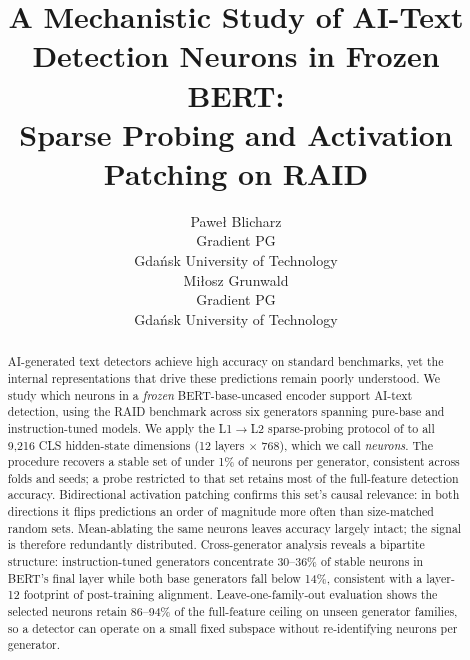 \documentclass[11pt]{article}
\title{A Mechanistic Study of AI-Text Detection Neurons in Frozen BERT:\\
Sparse Probing and Activation Patching on RAID}
\author{
  Paweł Blicharz \\
  Gradient PG \\
  Gdańsk University of Technology \\
  \And
  Miłosz Grunwald \\
  Gradient PG \\
  Gdańsk University of Technology \\
}
\newcommand{\bertbase}{BERT-base-uncased\xspace}
\begin{document}
\maketitle

\begin{abstract}
AI-generated text detectors achieve high accuracy on standard benchmarks, yet the internal representations that drive these predictions remain poorly understood. We study which neurons in a \textit{frozen} \bertbase encoder support AI-text detection, using the RAID benchmark across six generators spanning pure-base and instruction-tuned models. We apply the L1$\to$L2 sparse-probing protocol of \citet{gurnee2023haystack} to all 9{,}216 CLS hidden-state dimensions (12 layers $\times$ 768), which we call \textit{neurons}. The procedure recovers a stable set of under 1\% of neurons per generator, consistent across folds and seeds; a probe restricted to that set retains most of the full-feature detection accuracy. Bidirectional activation patching confirms this set's causal relevance: in both directions it flips predictions an order of magnitude more often than size-matched random sets. Mean-ablating the same neurons leaves accuracy largely intact; the signal is therefore redundantly distributed. Cross-generator analysis reveals a bipartite structure: instruction-tuned generators concentrate 30--36\% of stable neurons in BERT's final layer while both base generators fall below 14\%, consistent with a layer-12 footprint of post-training alignment. Leave-one-family-out evaluation shows the selected neurons retain 86--94\% of the full-feature ceiling on unseen generator families, so a detector can operate on a small fixed subspace without re-identifying neurons per generator.
\end{abstract}

\end{document}
